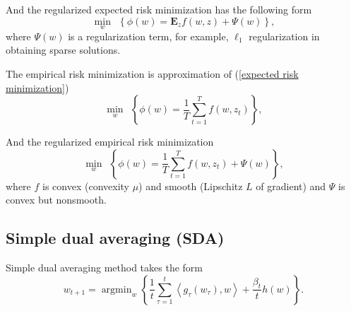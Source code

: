 And the regularized expected risk minimization has the following form
\begin{equation}\label{regularized expected risk minimization}
	\min_{w}~~\left\lbrace \phi(w)= \mathbf{E}_z f(w,z)+\Psi(w)\right\rbrace,
\end{equation}
where $\Psi(w)$ is a regularization term, for example, $\ell_1$ regularization in obtaining sparse solutions.

The empirical risk minimization is approximation of (\ref{expected risk minimization})
\begin{equation}\label{approximated optmization}
	\min_{w}~~\left\lbrace \phi(w)=\frac{1}{T}\sum_{t=1}^{T} f(w,z_t)\right\rbrace,
\end{equation}

And the regularized empirical risk minimization
\begin{equation}\label{approximated regularized optimization}
	\min_{w}~~\left\lbrace \phi(w)=\frac{1}{T} \sum_{t=1}^{T} f(w,z_t)+\Psi(w)\right\rbrace,
\end{equation}
where $f$ is convex (convexity $\mu$) and smooth (Lipschitz $L$ of gradient) and $\Psi$ is convex but nonsmooth.


\subsection{Simple dual averaging (SDA)}
Simple dual averaging method takes the form
\begin{equation}
	w_{t+1} = \mathop{\arg \min}_w \left\{ \frac{1}{t}\sum_{\tau=1}^{t} \left<g_{\tau}(w_\tau), w \right> + \frac{\beta_t}{t} h(w) \right\}.
\end{equation}


